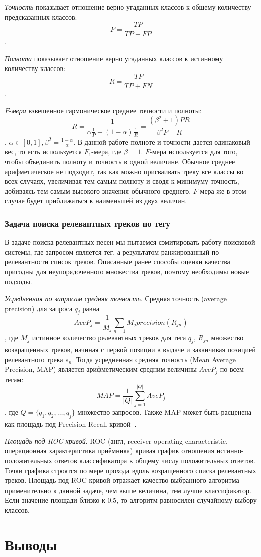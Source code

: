 \emph{Точность} показывает отношение верно угаданных классов к общему количеству предсказанных классов:
$$P = \frac{TP}{TP + FP}$$.

\emph{Полнота} показывает отношение верно угаданных классов к истинному количеству классов:
$$R = \frac{TP}{TP + FN}$$.

$F$-\emph{мера} \ld взвешенное гармоническое среднее точности и полноты:
$$R = \frac{1}{\alpha\frac{1}{P} + (1 - \alpha)\frac{1}{R}} = \frac{(\beta^2 + 1)PR}{\beta^2P + R}$$, 
$\alpha \in [0, 1], \beta^2 = \frac{1-\alpha}{\alpha}$. В данной работе полноте и точности дается одинаковый вес, то есть используется $F_1$-мера, где $\beta = 1$.
$F$-мера используется для того, чтобы объединить полноту и точность в одной величине. Обычное среднее арифметическое не подходит, так как можно присваивать треку 
все классы во всех случаях, увеличивая тем самым полноту и сводя к минимуму точность, добиваясь тем самым высокого значения обычного среднего. $F$-мера же в этом случае
будет приближаться к наименьшей из двух величин.

\subsubsection{Задача поиска релевантных треков по тегу}

В задаче поиска релевантных песен мы пытаемся сэмитировать работу поисковой системы, где запросом является тег, а результатом \ld ранжированный по релевантности список треков.
Описанные ранее способы оценки качества пригодны для неупорядоченного множества треков, поэтому необходимы новые подходы.

\emph{Усредненная по запросам средняя точность}. Средняя точность (average precision) для запроса $q_j$ равна 
$$ AveP_j = \frac{1}{M_j} \sum_{n=1}{M_j} precision(R_{jn})$$,
где $M_j$ \ld истинное количество релевантных треков для тега $q_j$, $R_{jn}$ \ld множество возвращенных треков, начиная с первой позиции в выдаче и заканчивая позицией 
релевантного трека $s_n$. Тогда усредненная средняя точность (Mean Average Precision, MAP) является арифметическим средним величины $AveP_j$ по всем тегам:
$$ MAP = \frac{1}{|Q|} \sum_{j=1}^{|Q|} AveP_j $$, где $Q = \{q_1, q_2, \ldots, q_j\}$ \ld множество запросов. 
Также MAP может быть расценена как площадь под Precision-Recall кривой~\cite{prec_recall}.

\emph{Площадь под ROC кривой}. ROC (англ, receiver operating characteristic, операционная характеристика приёмника) кривая \ld график отношения истинно-положительных ответов классификатора
к общему числу положительных ответов. Точки графика строятся по мере прохода вдоль возращенного списка релевантных треков. Площадь под ROC кривой отражает качество выбранного алгоритма применительно
к данной задаче, чем выше величина, тем лучше классификатор. Если значение площади близко к $0.5$, то алгоритм равносилен случайному выбору классов.

\section{Выводы}






